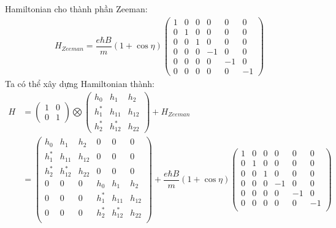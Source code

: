 \documentclass{report}
\newcommand{\f}[2]{\dfrac{#1}{#2}}
\begin{document}
Hamiltonian cho thành phần Zeeman:
\begin{align*}
	H_{Zeeman} = \f{e\hbar B}{m}(1+\cos\eta)
	\begin{pmatrix}
		1 & 0 & 0 & 0  & 0  & 0  \\
		0 & 1 & 0 & 0  & 0  & 0  \\
		0 & 0 & 1 & 0  & 0  & 0  \\
		0 & 0 & 0 & -1 & 0  & 0  \\
		0 & 0 & 0 & 0  & -1 & 0  \\
		0 & 0 & 0 & 0  & 0  & -1
	\end{pmatrix}
\end{align*}
Ta có thể xây dựng Hamiltonian thành:
\begin{align}
	H & =
	\begin{pmatrix}
		1 & 0 \\
		0 & 1
	\end{pmatrix}\bigotimes
	\begin{pmatrix}
		h_0   & h_1      & h_2    \\
		h_1^* & h_{11}   & h_{12} \\
		h_2^* & h_{12}^* & h_{22}
	\end{pmatrix}
	+
	H_{Zeeman}
	\nonumber \\
	  & =
	\begin{pmatrix}
		h_0   & h_1      & h_2    & 0       & 0        & 0      \\
		h_1^* & h_{11}   & h_{12} & 0       & 0        & 0      \\
		h_2^* & h_{12}^* & h_{22} & 0       & 0        & 0      \\
		0     & 0        & 0      & h_{0}   & h_1      & h_{2}  \\
		0     & 0        & 0      & h_1^*   & h_{11}   & h_{12} \\
		0     & 0        & 0      & h_{2}^* & h_{12}^* & h_{22} \\
	\end{pmatrix}
	+
	\f{e\hbar B}{m}(1+\cos\eta)
	\begin{pmatrix}
		1 & 0 & 0 & 0  & 0  & 0  \\
		0 & 1 & 0 & 0  & 0  & 0  \\
		0 & 0 & 1 & 0  & 0  & 0  \\
		0 & 0 & 0 & -1 & 0  & 0  \\
		0 & 0 & 0 & 0  & -1 & 0  \\
		0 & 0 & 0 & 0  & 0  & -1 \\
	\end{pmatrix} \nonumber
\end{align}
\end{document}
